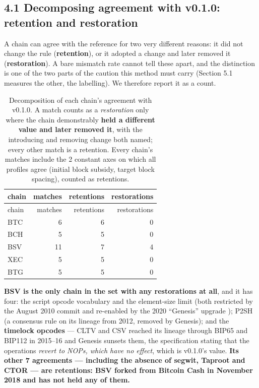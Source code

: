 \documentclass[
]{article}
\begin{document}
\subsection{4.1 Decomposing agreement with v0.1.0: retention and
restoration}\label{decomposing-agreement-with-v0.1.0-retention-and-restoration}

A chain can agree with the reference for two very different reasons: it
did not change the rule (\textbf{retention}), or it adopted a change and
later removed it (\textbf{restoration}). A bare mismatch rate cannot
tell these apart, and the distinction is one of the two parts of the
caution this method must carry (Section 5.1 measures the other, the
labelling). We therefore report it as a count.

\begin{longtable}[]{@{}lrrr@{}}
\caption{Decomposition of each chain's agreement with v0.1.0. A match
counts as a \emph{restoration} only where the chain demonstrably
\textbf{held a different value and later removed it}, with the
introducing and removing change both named; every other match is a
retention. Every chain's matches include the 2 constant axes on which
all profiles agree (initial block subsidy, target block spacing),
counted as retentions.}\tabularnewline
\toprule\noalign{}
chain & matches & retentions & restorations \\
\midrule\noalign{}
\endfirsthead
\toprule\noalign{}
chain & matches & retentions & restorations \\
\midrule\noalign{}
\endhead
\bottomrule\noalign{}
\endlastfoot
BTC & 6 & 6 & 0 \\
BCH & 5 & 5 & 0 \\
BSV & 11 & 7 & 4 \\
XEC & 5 & 5 & 0 \\
BTG & 5 & 5 & 0 \\
\end{longtable}

\textbf{BSV is the only chain in the set with any restorations at all},
and it has four: the script opcode vocabulary and the element-size limit
(both restricted by the August 2010 commit and re-enabled by the 2020
``Genesis'' upgrade \citep{bsv_genesis}); P2SH (a consensus rule on its
lineage from 2012, removed by Genesis); and the \textbf{timelock
opcodes} --- CLTV and CSV reached its lineage through BIP65 and BIP112
in 2015--16 and Genesis sunsets them, the specification stating that the
operations \emph{revert to NOPs, which have no effect}, which is
v0.1.0's value. \textbf{Its other 7 agreements --- including the absence
of segwit, Taproot and CTOR --- are retentions: BSV forked from Bitcoin
Cash in November 2018 and has not held any of them.}
\end{document}
